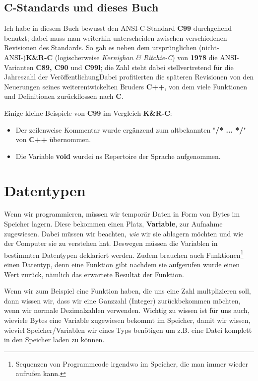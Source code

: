 \documentclass[b5paper,10pt,dvips,fleqn,titlepage,twoside]{book}
\begin{document}
\subsection{C-Standards und dieses Buch}
Ich habe in diesem Buch bewusst den ANSI-C-Standard \textbf{C99} durchgehend benutzt; dabei muss man weiterhin unterscheiden zwischen verschiedenen Revisionen des Standards. So gab es neben dem ursprünglichen (nicht-ANSI-)\textbf{K\&R-C} (logischerweise \emph{Kernighan \& Ritchie-C}) von \textbf{1978} die ANSI-Varianten \textbf{C89, C90} und \textbf{C99l}; die Zahl steht dabei stellvertretend für die Jahreszahl der Veröffentlichung\newline Dabei profitierten die späteren Revisionen von den Neuerungen seines weiterentwickelten Bruders \textbf{C++}, von dem viele Funktionen und Definitionen zurückflossen nach \textbf{C}.

Einige kleine Beispiele von \textbf{C99} im Vergleich \textbf{K\&R-C}:

\begin{itemize}
 \item Der zeilenweise Kommentar wurde ergänzend zum altbekannten "\textbf{/* ... */}" von \textbf{C++} übernommen.
\item Die Variable \textbf{void} wurdei ns Repertoire der Sprache aufgenommen.
\end{itemize}

\section{Datentypen}
Wenn wir programmieren, müssen wir temporär Daten in Form von Bytes im Speicher lagern. Diese bekommen einen Platz, \textbf{Variable}, zur Aufnahme zugewiesen. Dabei müssen wir beachten, \emph{wie} wir sie ablagern möchten und wie der Computer sie zu verstehen hat. Deswegen müssen die Variablen in bestimmten Datentypen deklariert werden. Zudem brauchen auch Funktionen\footnote{Sequenzen von Programmcode irgendwo im Speicher, die man immer wieder aufrufen kann.} einen Datentyp, denn eine Funktion gibt nachdem sie aufgerufen wurde einen Wert zurück, nämlich das erwartete Resultat der Funktion.

Wenn wir zum Beispiel eine Funktion haben, die uns eine Zahl multplizieren soll, dann wissen wir, dass wir eine Ganzzahl (Integer) zurückbekommen möchten, wenn wir normale Dezimalzahlen verwenden. Wichtig zu wissen ist für uns auch, wieviele Bytes eine Variable zugewiesen bekommt im Speicher, damit wir wissen, wieviel Speicher/Variablen wir eines Typs benötigen um z.B. eine Datei komplett in den Speicher laden zu können.
\end{document}

